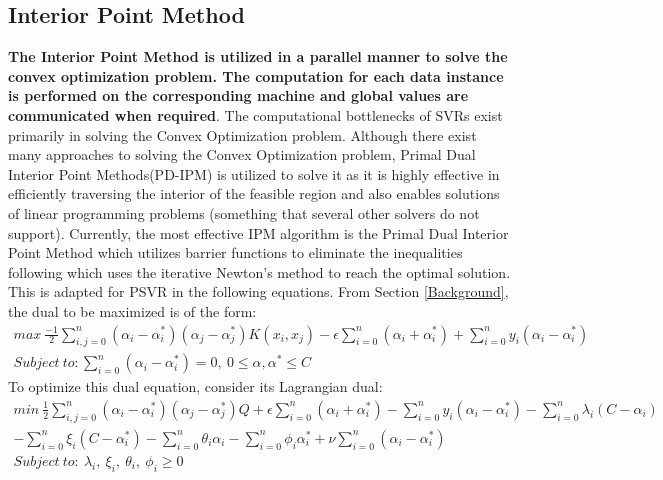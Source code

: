 \documentclass[12pt]{article}
\begin{document}
 \subsection{Interior Point Method}
 \label{Interior Point Method}
  {\bf The Interior Point Method is utilized in a parallel manner to solve the convex optimization problem. The computation for each data instance is performed on the corresponding machine and global values are communicated when required}.
  \newline\newline
 The computational bottlenecks of SVRs exist primarily in solving the Convex Optimization problem. Although there exist many approaches to solving the Convex Optimization problem, Primal Dual Interior Point Methods(PD-IPM) is utilized to solve it as it is highly effective in efficiently traversing the interior of the feasible region and also enables solutions of linear programming problems (something that several other solvers do not support).
\newline
Currently, the most effective IPM algorithm is the Primal Dual Interior Point Method which utilizes barrier functions to eliminate the inequalities following which uses the iterative Newton's method to reach the optimal solution.
\newline
 This is adapted for PSVR in the following equations.
 \newline\newline
From Section \ref{Background}, the dual to be maximized is of the form: 
\begin{gather*} 
 max\  \frac{-1}{2}\sum_{i, j=0}^{n}{(\alpha_{i} - \alpha_{i}^*)(\alpha_{j} - \alpha_{j}^*)K(x_{i}, x_{j})} - \epsilon\sum_{i=0}^{n}{(\alpha_{i} + \alpha_{i}^*)}+\sum_{i=0}^{n}{y_{i}(\alpha_{i} - \alpha_{i}^*)}   \\
 Subject \ to: \sum_{i=0}^{n}{(\alpha_{i} - \alpha_{i}^*)} = 0, \ 0\leq\alpha, \alpha^*\leq C
 \end{gather*}
 \newline
To optimize this dual equation, consider its Lagrangian dual:
 \begin{gather*} 
min\  \frac{1}{2}\sum_{i, j=0}^{n}{(\alpha_{i} - \alpha_{i}^*)(\alpha_{j} - \alpha_{j}^*)Q} + \epsilon\sum_{i=0}^{n}{(\alpha_{i} + \alpha_{i}^*)}-\sum_{i=0}^{n}{y_{i}(\alpha_{i} - \alpha_{i}^*)}-\sum_{i=0}^{n}{\lambda_{i}(C-\alpha_{i})}\\-\sum_{i=0}^{n}{\xi_{i}(C-\alpha^*_{i})}-\sum_{i=0}^{n}{\theta_{i}\alpha_{i}}-\sum_{i=0}^{n}{\phi_{i}\alpha^*_{i}}+\nu\sum_{i=0}^{n}{(\alpha_{i} - \alpha_{i}^*)}\\
Subject \ to:\ \lambda_{i},\ \xi_{i},\ \theta_{i},\ \phi_{i} \geq 0
 \end{gather*}
\end{document}
